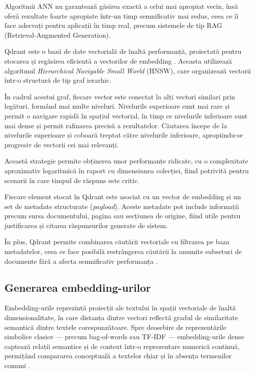 \documentclass[12pt, a4paper, oneside, romanian]{teza-upb}
\begin{document}
Algoritmii ANN nu garantează găsirea exactă a celui mai apropiat vecin, însă oferă rezultate foarte apropiate 
într-un timp semnificativ mai redus, ceea ce îi face adecvați pentru aplicații în timp real, precum sistemele 
de tip RAG (Retrieval-Augmented Generation).

Qdrant este o bază de date vectorială de înaltă performanță, proiectată pentru stocarea și regăsirea eficientă 
a vectorilor de embedding \cite{qdrant_doc}. Aceasta utilizează algoritmul 
\textit{Hierarchical Navigable Small World} (HNSW), care organizează vectorii într-o structură de tip graf ierarhic.

În cadrul acestui graf, fiecare vector este conectat la alți vectori similari prin legături, formând mai multe niveluri. 
Nivelurile superioare sunt mai rare și permit o navigare rapidă în spațiul vectorial, în timp ce nivelurile inferioare 
sunt mai dense și permit rafinarea precisă a rezultatelor. Căutarea începe de la nivelurile superioare și coboară treptat 
către nivelurile inferioare, apropiindu-se progresiv de vectorii cei mai relevanți.

Această strategie permite obținerea unor performanțe ridicate, cu o complexitate aproximativ logaritmică 
în raport cu dimensiunea colecției, fiind potrivită pentru scenarii în care timpul de răspuns este critic.

Fiecare element stocat în Qdrant este asociat cu un vector de embedding și un set de metadate structurate 
(\textit{payload}). Aceste metadate pot include informații precum sursa documentului, pagina sau secțiunea de origine, 
fiind utile pentru justificarea și citarea răspunsurilor generate de sistem.

În plus, Qdrant permite combinarea căutării vectoriale cu filtrarea pe baza metadatelor, ceea ce face posibilă 
restrângerea căutării la anumite subseturi de documente fără a afecta semnificativ performanța \cite{qdrant_doc}.

\subsection{Generarea embedding-urilor}

Embedding-urile reprezintă proiecții ale textului în spații vectoriale de înaltă dimensionalitate, în care distanța dintre vectori reflectă gradul de similaritate semantică dintre textele corespunzătoare. Spre deosebire de reprezentările simbolice clasice — precum bag-of-words sau TF-IDF — embedding-urile dense captează relații semantice și de context 
într-o reprezentare numerică continuă, permițând compararea conceptuală a textelor chiar și în absența termenilor comuni \cite{mikolov2013word2vec}.
\end{document}
